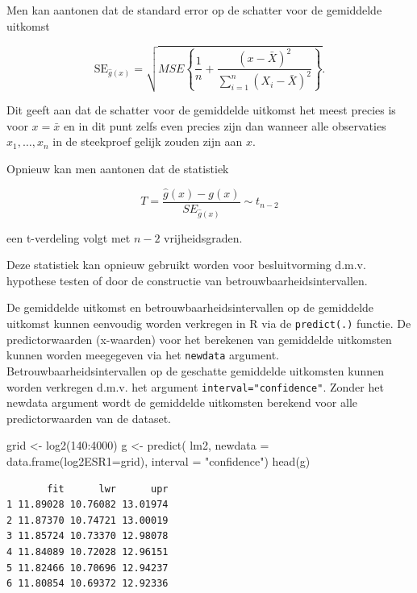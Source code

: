 \documentclass[
  dutch,
  letterpaper,
  12pt]{book}
\newenvironment{Shaded}{\begin{snugshade}}{\end{snugshade}}
\newcommand{\AttributeTok}[1]{\textcolor[rgb]{0.40,0.45,0.13}{#1}}
\newcommand{\DecValTok}[1]{\textcolor[rgb]{0.68,0.00,0.00}{#1}}
\newcommand{\FunctionTok}[1]{\textcolor[rgb]{0.28,0.35,0.67}{#1}}
\newcommand{\NormalTok}[1]{\textcolor[rgb]{0.00,0.23,0.31}{#1}}
\newcommand{\OtherTok}[1]{\textcolor[rgb]{0.00,0.23,0.31}{#1}}
\newcommand{\SpecialCharTok}[1]{\textcolor[rgb]{0.37,0.37,0.37}{#1}}
\newcommand{\StringTok}[1]{\textcolor[rgb]{0.13,0.47,0.30}{#1}}
\theoremstyle{definition}
\theoremstyle{definition}
\theoremstyle{definition}
\theoremstyle{remark}
\begin{document}
Men kan aantonen dat de standard error op de schatter voor de gemiddelde
uitkomst

\[\text{SE}_{\hat{g}(x)}=\sqrt{MSE\left\{\frac{1}{n}+\frac{(x-\bar X)^2}{\sum\limits_{i=1}^n (X_i-\bar X)^2}\right\}}.\]

Dit geeft aan dat de schatter voor de gemiddelde uitkomst het meest
precies is voor \(x=\bar x\) en in dit punt zelfs even precies zijn dan
wanneer alle observaties \(x_1,\ldots, x_n\) in de steekproef gelijk
zouden zijn aan \(x\).

Opnieuw kan men aantonen dat de statistiek

\[T=\frac{\hat{g}(x)-g(x)}{SE_{\hat{g}(x)}}\sim t_{n-2}\]

een t-verdeling volgt met \(n-2\) vrijheidsgraden.

Deze statistiek kan opnieuw gebruikt worden voor besluitvorming d.m.v.
hypothese testen of door de constructie van betrouwbaarheidsintervallen.

De gemiddelde uitkomst en betrouwbaarheidsintervallen op de gemiddelde
uitkomst kunnen eenvoudig worden verkregen in R via de
\texttt{predict(.)} functie. De predictorwaarden (x-waarden) voor het
berekenen van gemiddelde uitkomsten kunnen worden meegegeven via het
\texttt{newdata} argument. Betrouwbaarheidsintervallen op de geschatte
gemiddelde uitkomsten kunnen worden verkregen d.m.v. het argument
\texttt{interval="confidence"}. Zonder het newdata argument wordt de
gemiddelde uitkomsten berekend voor alle predictorwaarden van de
dataset.

\begin{Shaded}
\begin{Highlighting}[]
\NormalTok{grid }\OtherTok{\textless{}{-}} \FunctionTok{log2}\NormalTok{(}\DecValTok{140}\SpecialCharTok{:}\DecValTok{4000}\NormalTok{)}
\NormalTok{g }\OtherTok{\textless{}{-}} \FunctionTok{predict}\NormalTok{(}
\NormalTok{  lm2,}
  \AttributeTok{newdata =} \FunctionTok{data.frame}\NormalTok{(}\AttributeTok{log2ESR1=}\NormalTok{grid),}
  \AttributeTok{interval =} \StringTok{"confidence"}\NormalTok{)}
\FunctionTok{head}\NormalTok{(g)}
\end{Highlighting}
\end{Shaded}

\begin{verbatim}
       fit      lwr      upr
1 11.89028 10.76082 13.01974
2 11.87370 10.74721 13.00019
3 11.85724 10.73370 12.98078
4 11.84089 10.72028 12.96151
5 11.82466 10.70696 12.94237
6 11.80854 10.69372 12.92336
\end{verbatim}
\end{document}
